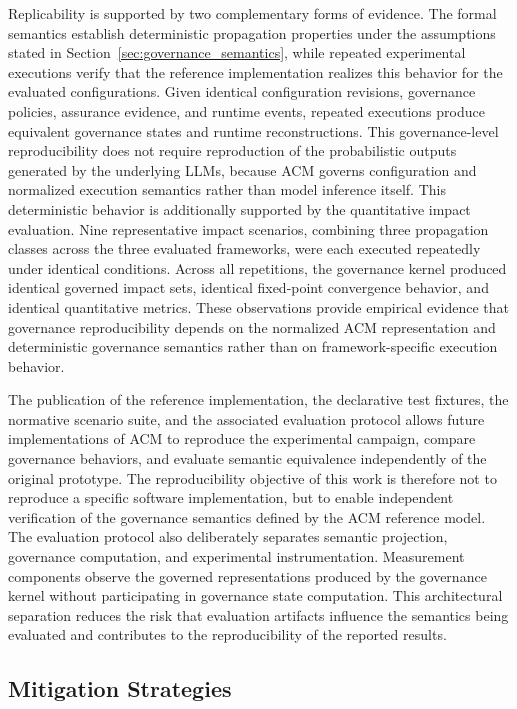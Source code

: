 \documentclass[10pt]{article}
\begin{document}
Replicability is supported by two complementary forms of evidence. The formal semantics establish deterministic propagation properties under the assumptions stated in Section~\ref{sec:governance_semantics}, while repeated experimental executions verify that the reference implementation realizes this behavior for the evaluated configurations. Given identical configuration revisions, governance policies, assurance evidence, and runtime events, repeated executions produce equivalent governance states and runtime reconstructions. 
This governance-level reproducibility does not require reproduction of the probabilistic outputs generated by the underlying LLMs, because ACM governs configuration and normalized execution semantics rather than model inference itself.
This deterministic behavior is additionally supported by the quantitative impact evaluation. Nine representative impact scenarios, combining three propagation classes across the three evaluated frameworks, were each executed repeatedly under identical conditions. Across all repetitions, the governance kernel produced identical governed impact sets, identical fixed-point convergence behavior, and identical quantitative metrics. These observations provide empirical evidence that governance reproducibility depends on the normalized ACM representation and deterministic governance semantics rather than on framework-specific execution behavior.

The publication of the reference implementation, the declarative test
fixtures, the normative scenario suite, and the associated evaluation protocol allows future implementations of ACM to reproduce the experimental campaign, compare governance behaviors, and evaluate semantic equivalence independently of the original prototype. The reproducibility objective of this work is therefore not to reproduce a specific software implementation, but to enable independent verification of the governance semantics defined by the ACM reference model.
The evaluation protocol also deliberately separates semantic projection, governance computation, and experimental instrumentation. Measurement components observe the governed representations produced by the governance kernel without participating in governance state computation. This architectural separation reduces the risk that evaluation artifacts influence the semantics being evaluated and contributes to the reproducibility of the reported results.


\subsection{Mitigation Strategies}
\label{sec:mitigation_strategies}
\end{document}
